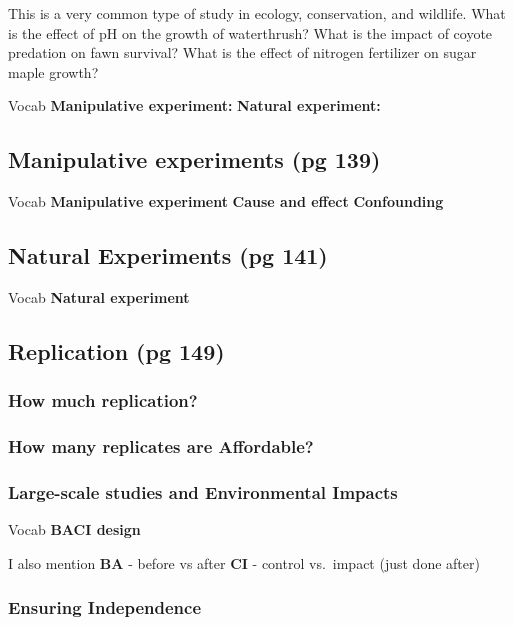 \documentclass[]{book}
\theoremstyle{definition}
\theoremstyle{definition}
\theoremstyle{definition}
\theoremstyle{remark}
\begin{document}
This is a very common type of study in ecology, conservation, and
wildlife. What is the effect of pH on the growth of waterthrush? What is
the impact of coyote predation on fawn survival? What is the effect of
nitrogen fertilizer on sugar maple growth?

Vocab \textbf{Manipulative experiment:} \textbf{Natural experiment:}

\subsection{Manipulative experiments (pg
139)}\label{manipulative-experiments-pg-139}

Vocab \textbf{Manipulative experiment} \textbf{Cause and effect}
\textbf{Confounding}

\subsection{Natural Experiments (pg
141)}\label{natural-experiments-pg-141}

Vocab \textbf{Natural experiment}

\subsection{Replication (pg 149)}\label{replication-pg-149}

\subsubsection{How much replication?}\label{how-much-replication}

\subsubsection{How many replicates are
Affordable?}\label{how-many-replicates-are-affordable}

\subsubsection{Large-scale studies and Environmental
Impacts}\label{large-scale-studies-and-environmental-impacts}

Vocab \textbf{BACI design}

I also mention \textbf{BA} - before vs after \textbf{CI} - control
vs.~impact (just done after)

\subsubsection{Ensuring Independence}\label{ensuring-independence}
\end{document}
